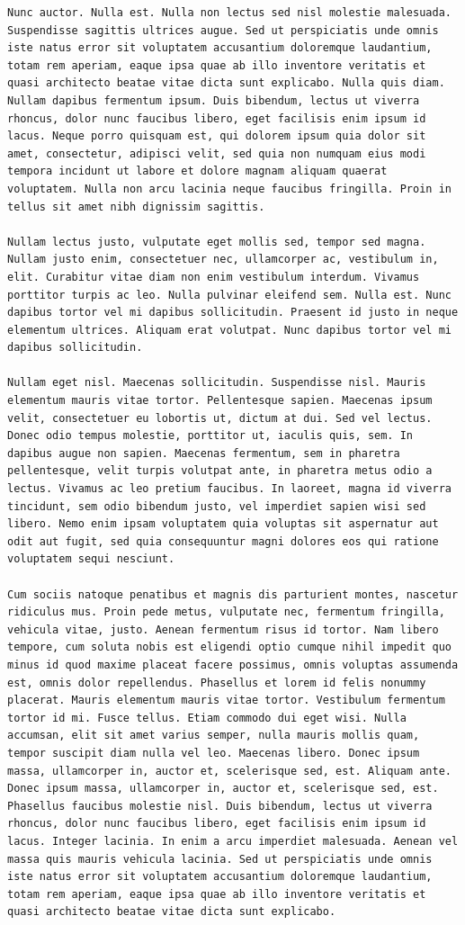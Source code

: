 \documentclass[a4paper, 12pt]{article}
\begin{document}
\begin{verbatim}
Nunc auctor. Nulla est. Nulla non lectus sed nisl molestie malesuada. Suspendisse sagittis ultrices augue. Sed ut perspiciatis unde omnis iste natus error sit voluptatem accusantium doloremque laudantium, totam rem aperiam, eaque ipsa quae ab illo inventore veritatis et quasi architecto beatae vitae dicta sunt explicabo. Nulla quis diam. Nullam dapibus fermentum ipsum. Duis bibendum, lectus ut viverra rhoncus, dolor nunc faucibus libero, eget facilisis enim ipsum id lacus. Neque porro quisquam est, qui dolorem ipsum quia dolor sit amet, consectetur, adipisci velit, sed quia non numquam eius modi tempora incidunt ut labore et dolore magnam aliquam quaerat voluptatem. Nulla non arcu lacinia neque faucibus fringilla. Proin in tellus sit amet nibh dignissim sagittis.

Nullam lectus justo, vulputate eget mollis sed, tempor sed magna. Nullam justo enim, consectetuer nec, ullamcorper ac, vestibulum in, elit. Curabitur vitae diam non enim vestibulum interdum. Vivamus porttitor turpis ac leo. Nulla pulvinar eleifend sem. Nulla est. Nunc dapibus tortor vel mi dapibus sollicitudin. Praesent id justo in neque elementum ultrices. Aliquam erat volutpat. Nunc dapibus tortor vel mi dapibus sollicitudin.

Nullam eget nisl. Maecenas sollicitudin. Suspendisse nisl. Mauris elementum mauris vitae tortor. Pellentesque sapien. Maecenas ipsum velit, consectetuer eu lobortis ut, dictum at dui. Sed vel lectus. Donec odio tempus molestie, porttitor ut, iaculis quis, sem. In dapibus augue non sapien. Maecenas fermentum, sem in pharetra pellentesque, velit turpis volutpat ante, in pharetra metus odio a lectus. Vivamus ac leo pretium faucibus. In laoreet, magna id viverra tincidunt, sem odio bibendum justo, vel imperdiet sapien wisi sed libero. Nemo enim ipsam voluptatem quia voluptas sit aspernatur aut odit aut fugit, sed quia consequuntur magni dolores eos qui ratione voluptatem sequi nesciunt.

Cum sociis natoque penatibus et magnis dis parturient montes, nascetur ridiculus mus. Proin pede metus, vulputate nec, fermentum fringilla, vehicula vitae, justo. Aenean fermentum risus id tortor. Nam libero tempore, cum soluta nobis est eligendi optio cumque nihil impedit quo minus id quod maxime placeat facere possimus, omnis voluptas assumenda est, omnis dolor repellendus. Phasellus et lorem id felis nonummy placerat. Mauris elementum mauris vitae tortor. Vestibulum fermentum tortor id mi. Fusce tellus. Etiam commodo dui eget wisi. Nulla accumsan, elit sit amet varius semper, nulla mauris mollis quam, tempor suscipit diam nulla vel leo. Maecenas libero. Donec ipsum massa, ullamcorper in, auctor et, scelerisque sed, est. Aliquam ante. Donec ipsum massa, ullamcorper in, auctor et, scelerisque sed, est. Phasellus faucibus molestie nisl. Duis bibendum, lectus ut viverra rhoncus, dolor nunc faucibus libero, eget facilisis enim ipsum id lacus. Integer lacinia. In enim a arcu imperdiet malesuada. Aenean vel massa quis mauris vehicula lacinia. Sed ut perspiciatis unde omnis iste natus error sit voluptatem accusantium doloremque laudantium, totam rem aperiam, eaque ipsa quae ab illo inventore veritatis et quasi architecto beatae vitae dicta sunt explicabo.


\end{verbatim}
\end{document}
